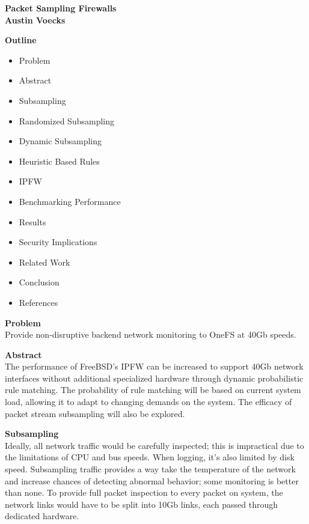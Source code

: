 \documentclass[fleqn]{article}%
\begin{document}
\begin{center}
  \textbf{Packet Sampling Firewalls \\ Austin Voecks}\\
\end{center}

\textbf{Outline}
\begin{itemize}
    \item Problem
    \item Abstract
    \item Subsampling
    \item Randomized Subsampling
    \item Dynamic Subsampling
    \item Heuristic Based Rules
    \item IPFW
    \item Benchmarking Performance
    \item Results
    \item Security Implications
    \item Related Work
    \item Conclusion
    \item References
\end{itemize}

\textbf{Problem} \\
Provide non-disruptive backend network monitoring to OneFS at 40Gb speeds.

\textbf{Abstract} \\
The performance of FreeBSD’s IPFW can be increased to support 40Gb network
interfaces without additional specialized hardware through dynamic
probabilistic rule matching. The probability of rule matching will be based on
current system load, allowing it to adapt to changing demands on the system.
The efficacy of packet stream subsampling will also be explored.

\textbf{Subsampling} \\
Ideally, all network traffic would be carefully inspected; this is impractical
due to the limitations of CPU and bus speeds. When logging, it’s also limited
by disk speed. Subsampling traffic provides a way take the temperature of the
network and increase chances of detecting abnormal behavior; some monitoring is
better than none. To provide full packet inspection to every packet on system,
the network links would have to be split into 10Gb links, each passed through
dedicated hardware. 
\end{document}
